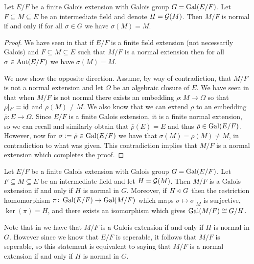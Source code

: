 \documentclass[11pt,a4paper]{article}
\begin{document}
\begin{lemma}
  \label{lem:lemma-for-galois-part-b-two}
  Let $E/F$ be a finite Galois extension with Galois group
  $G = \operatorname{Gal}(E/F)$.
  Let $F \subseteq M \subseteq E$ be an intermediate field
  and denote $H = \mathcal G(M)$.
  Then $M/F$ is normal if and only if for all $\sigma \in G$
  we have $\sigma(M) = M$.
\end{lemma}
\begin{proof}
  We have seen in 
  that if $E/F$ is a finite field extension (not necessarily Galois)
  and $F \subseteq M \subseteq E$ such that $M/F$ is a normal
  extension then for all $\sigma \in \operatorname{Aut}(E/F)$
  we have $\sigma(M) = M$.

  We now show the opposite direction.
  Assume, by way of contradiction,
  that $M/F$ is not a normal extension
  and let $\Omega$ be an algebraic closure of $E$.
  We have seen in  that when $M/F$ is not normal
  there exists an embedding $\rho \colon M \to \Omega$
  so that $\rho\vert_F = \operatorname{id}$ and $\rho(M) \neq M$.
  We also know that we can extend $\rho$
  to an embedding $\bar \rho \colon E \to \Omega$.
  Since $E/F$ is a finite Galois extension, it is a finite normal extension, so
  we can recall  and similarly obtain
  that $\bar \rho(E) = E$ and thus $\bar \rho \in \operatorname{Gal}(E/F)$.
  However, now for $\sigma := \bar \rho \in \operatorname{Gal}(E/F)$
  we have that $\sigma(M) = \rho(M) \neq M$, in contradiction to
  what was given.
  This contradiction implies that $M/F$ is a normal extension which
  completes the proof.
\end{proof}

\begin{theorem}
  \label{thm:galois-B}
  Let $E/F$ be a finite Galois extension with Galois group
  $G = \operatorname{Gal}(E/F)$.
  Let $F \subseteq M \subseteq E$ be an intermediate field and
  let $H = \mathcal G(M)$.
  Then $M/F$ is a Galois extension if and only if $H$ is normal in $G$.
  Moreover, if $H \triangleleft\, G$ then the restriction homomorphism
  $\pi \colon \operatorname{Gal}(E/F) \to \operatorname{Gal}(M/F)$
  which maps $\sigma \mapsto \sigma\vert_M$ is surjective,
  $\ker(\pi) = H$, and there exists an isomorphism 
  which gives $\operatorname{Gal}(M/F) \cong G/H$.
\end{theorem}
\begin{remark}
  Note that in  we have that
  $M/F$ is a Galois extension if and only if $H$ is normal in $G$.
  However since we know that $E/F$ is seperable,
  it follows that $M/F$ is seperable,
  so this statement is equivalent to saying that
  $M/F$ is a normal extension if and only if $H$ is normal in $G$.
\end{remark}
\end{document}
